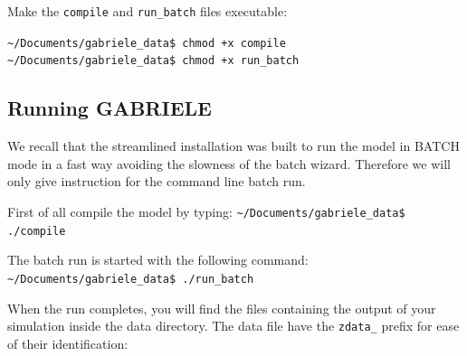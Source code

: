 \documentclass{book}
\begin{document}
\vskip2mm
Make the \verb+compile+ and \verb+run_batch+ files executable:

\vskip2mm
\noindent\verb+~/Documents/gabriele_data$ +\color{red}\verb|chmod +x compile| \color{black}\\
\verb+~/Documents/gabriele_data$ +\color{red}\verb|chmod +x run_batch| \color{black}
\vskip2mm


\subsection{Running GABRIELE}

We recall that the streamlined installation was built to run the model in BATCH mode in a fast way avoiding the slowness of the batch wizard. Therefore we will only give instruction for the command line batch run.

First of all compile the model by typing:
\vskip2mm
\noindent\verb+~/Documents/gabriele_data$ +\color{red}\verb|./compile| \color{black}
\vskip2mm

The batch run is started with the following command:
\vskip2mm
\noindent\verb+~/Documents/gabriele_data$ +\color{red}\verb|./run_batch| \color{black}
\vskip2mm

When the run completes, you will find the files containing the output of your simulation inside the data directory.
The data file have the \verb+zdata_+ prefix for ease of their identification: 
\end{document}
